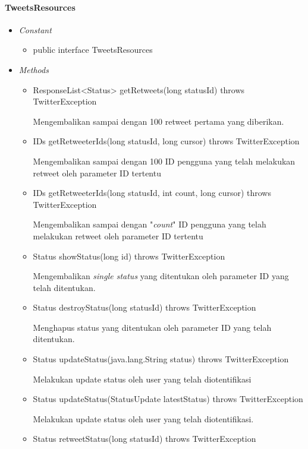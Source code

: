 	\paragraph{TweetsResources}
	
	\begin{itemize}
		\item \textit{Constant}
		
			\begin{itemize}
				\item public interface TweetsResources
			\end{itemize}
		\item \textit{Methods}
		
		\begin{itemize}
			\item ResponseList<Status> getRetweets(long statusId) throws TwitterException
			
			Mengembalikan sampai dengan 100 retweet pertama yang diberikan.
			\item IDs getRetweeterIds(long statusId, long cursor) throws TwitterException
			
			Mengembalikan sampai dengan 100 ID pengguna yang telah melakukan retweet oleh parameter ID tertentu
			\item IDs getRetweeterIds(long statusId, int count, long cursor) throws TwitterException
			
			Mengembalikan sampai dengan "\textit{count}" ID pengguna yang telah melakukan retweet oleh parameter ID tertentu
			\item Status showStatus(long id) throws TwitterException
			
			Mengembalikan \textit{single status} yang ditentukan oleh parameter ID yang telah ditentukan.
			\item Status destroyStatus(long statusId) throws TwitterException
			
			Menghapus status yang ditentukan oleh parameter ID yang telah ditentukan.
			\item Status updateStatus(java.lang.String status) throws TwitterException
			
			Melakukan update status oleh user yang telah diotentifikasi
			\item Status updateStatus(StatusUpdate latestStatus) throws TwitterException
			
			Melakukan update status oleh user yang telah diotentifikasi.
			\item Status retweetStatus(long statusId) throws TwitterException
			

\end{itemize}
\end{itemize}
